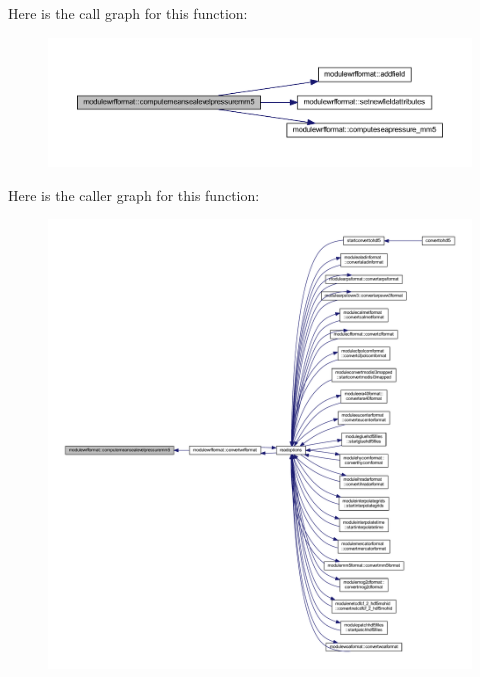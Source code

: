 Here is the call graph for this function\+:\nopagebreak
\begin{figure}[H]
\begin{center}
\leavevmode
\includegraphics[width=350pt]{namespacemodulewrfformat_ab2193cc6ab00a1375b87ea785f839b04_cgraph}
\end{center}
\end{figure}
Here is the caller graph for this function\+:\nopagebreak
\begin{figure}[H]
\begin{center}
\leavevmode
\includegraphics[width=350pt]{namespacemodulewrfformat_ab2193cc6ab00a1375b87ea785f839b04_icgraph}
\end{center}
\end{figure}
\mbox{\label{namespacemodulewrfformat_afda201375ff1c4cfb0d863734c03535c}} 
